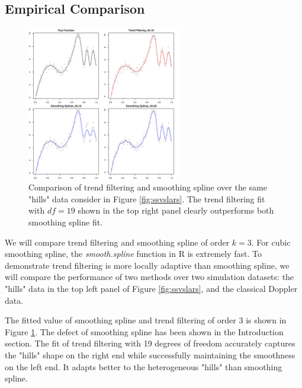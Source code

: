 \documentclass[a4paper]{article}
\begin{document}
\subsection{Empirical Comparison}
\label{subsec:sssimu}
\begin{figure}[t]
\centering
\includegraphics[width = 0.6\textwidth]{Figures/Figure4.pdf}
\caption{Comparison of trend filtering and smoothing spline over the same "hills" data consider in Figure \ref{fig:ssvslars}. The trend filtering fit with $df = 19$ shown in the top right panel clearly outperforms both smoothing spline fit.}
\label{fig:Figure4_ssvstfhills}
\end{figure}

We will compare trend filtering and smoothing spline of order $k = 3$. For cubic smoothing spline, the \textit{smooth.spline} function in R is extremely fast. To demonstrate trend filtering is more locally adaptive than smoothing spline, we will compare the performance of two methods over two simulation datasets: the "hills" data in the top left panel of Figure \ref{fig:ssvslars}, and the classical Doppler data. 


The fitted value of smoothing spline and trend filtering of order $3$ is shown in Figure \ref{fig:Figure4_ssvstfhills}. The defect of smoothing spline has been shown in the Introduction section. The fit of trend filtering with 19 degrees of freedom accurately captures the "hills" shape on the right end while successfully maintaining the smoothness on the left end. It adapts better to the heterogeneous "hills" than smoothing spline.
\end{document}
